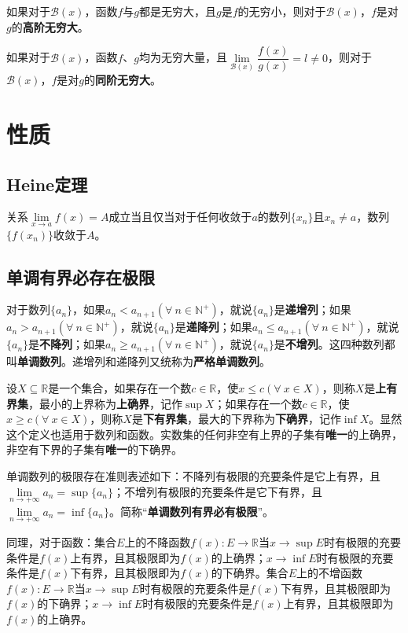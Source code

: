 \documentclass[fontset=none,openany,a4paper]{ctexbook}
\begin{document}
如果对于$\mathcal{B}(x)$，函数$f$与$g$都是无穷大，且$g$是$f$的无穷小，则对于$\mathcal{B}(x)$，$f$是对$g$的\textbf{高阶无穷大}。

如果对于$\mathcal{B}(x)$，函数$f$、$g$均为无穷大量，且$\lim\limits_{\mathcal{B}(x)}\dfrac{f(x)}{g(x)}=l\neq 0$，则对于$\mathcal{B}(x)$，$f$是对$g$的\textbf{同阶无穷大}。

\section{性质}

\subsection{Heine定理}

关系$\lim\limits_{x\to a}f(x)=A$成立当且仅当对于任何收敛于$a$的数列$\{x_n\}$且$x_n\neq a$，数列$\{f(x_n)\}$收敛于$A$。

\subsection{单调有界必存在极限}

对于数列$\{a_n\}$，如果$a_n<a_{n+1}(\forall\ n\in\mathbb{N}^+)$，就说$\{a_n\}$是\textbf{递增列}；如果$a_n>a_{n+1}(\forall\ n\in\mathbb{N}^+)$，就说$\{a_n\}$是\textbf{递降列}；如果$a_n\leqslant a_{n+1}(\forall\ n\in\mathbb{N}^+)$，就说$\{a_n\}$是\textbf{不降列}；如果$a_n\geqslant a_{n+1}(\forall\ n\in\mathbb{N}^+)$，就说$\{a_n\}$是\textbf{不增列}。这四种数列都叫\textbf{单调数列}。递增列和递降列又统称为\textbf{严格单调数列}。

设$X\subseteq\mathbb{R}$是一个集合，如果存在一个数$c\in\mathbb{R}$，使$x\leqslant c(\forall\ x\in X)$，则称$X$是\textbf{上有界集}，最小的上界称为\textbf{上确界}，记作$\sup X$；如果存在一个数$c\in\mathbb{R}$，使$x\geqslant c(\forall\ x\in X)$，则称$X$是\textbf{下有界集}，最大的下界称为\textbf{下确界}，记作$\inf X$。显然这个定义也适用于数列和函数。实数集的任何非空有上界的子集有\textbf{唯一}的上确界，非空有下界的子集有\textbf{唯一}的下确界。

单调数列的极限存在准则表述如下：不降列有极限的充要条件是它上有界，且$\lim\limits_{n\to+\infty}a_n=\sup\{a_n\}$；不增列有极限的充要条件是它下有界，且$\lim\limits_{n\to+\infty}a_n=\inf\{a_n\}$。简称“\textbf{单调数列有界必有极限}”。

同理，对于函数：集合$E$上的不降函数$f(x):E\to\mathbb{R}$当$x\to\sup E$时有极限的充要条件是$f(x)$上有界，且其极限即为$f(x)$的上确界；$x\to\inf E$时有极限的充要条件是$f(x)$下有界，且其极限即为$f(x)$的下确界。集合$E$上的不增函数$f(x):E\to\mathbb{R}$当$x\to\sup E$时有极限的充要条件是$f(x)$下有界，且其极限即为$f(x)$的下确界；$x\to\inf E$时有极限的充要条件是$f(x)$上有界，且其极限即为$f(x)$的上确界。
\end{document}
